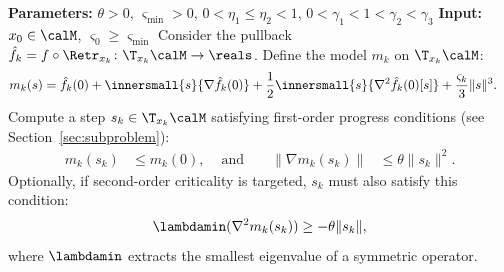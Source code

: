 \begin{algorithm}[t]
	\caption{Riemannian adaptive regularization with cubics (ARC)}
	\label{algo:ARC}
	\begin{algorithmic}[1]
		\State \textbf{Parameters: } $\theta > 0$, $\varsigma_{\min} > 0$, $0 < \eta_1 \leq \eta_2 < 1$, $0 < \gamma_1 < 1 < \gamma_2 < \gamma_3$ %
		\State \textbf{Input:} $x_0 \in \calM$, $\varsigma_0 \geq \varsigma_{\min}$
		\State Consider the pullback $\hat f_k = f \circ \Retr_{x_k} \colon \T_{x_k}\calM \to \reals$. Define the model $m_k$ on $\T_{x_k}\calM$: %
		\begin{align}
			m_k(s) & = \hat f_k(0) + \innersmall{s}{\nabla \hat f_k(0)} + \frac{1}{2}\innersmall{s}{\nabla^2 \hat f_k(0)[s]} + \frac{\varsigma_k}{3} \|s\|^3.
			\label{eq:mk}
		\end{align}
		\State Compute a step $s_k \in \T_{x_k}\calM$ satisfying first-order progress conditions (see Section~\ref{sec:subproblem}):
		\begin{align}
			m_k(s_k) & \leq m_k(0), & \textrm{ and } & & \|\nabla m_k(s_k)\| & \leq \theta \|s_k\|^2.
			\label{eq:firstorderprogress}
		\end{align}
		\Statex \hspace{4.5mm} Optionally, if second-order criticality is targeted, $s_k$ must also satisfy this condition:
		\begin{align}
			\lambdamin(\nabla^2 m_k(s_k)) \geq -\theta \|s_k\|,
			\label{eq:secondorderprogress}
		\end{align}
		\Statex \hspace{4.5mm} where $\lambdamin$ extracts the smallest eigenvalue of a symmetric operator.
		

\end{algorithmic}
\end{algorithm}
